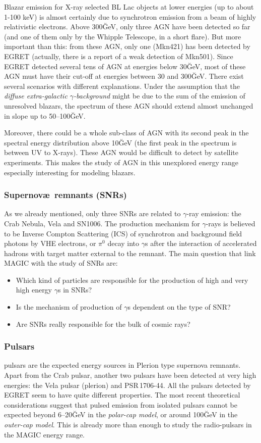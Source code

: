 Blazar emission for X-ray selected BL Lac objects at lower energies
(up to about 1-100 keV) is almost certainly due to synchrotron
emission from a beam of highly relativistic electrons. Above
300\u{GeV}, only three AGN have been detected so far (and one of them
only by the Whipple Telescope, in a short flare). But more important
than this: from these AGN, only one (Mkn421) has been detected by
EGRET (actually, there is a report of a weak detection of Mkn501).
Since EGRET detected several tens of AGN at energies below 30\u{GeV},
most of these AGN must have their cut-off at energies between 30 and
300\u{GeV}. There exist several scenarios with different explanations.
Under the assumption that the \emph{diffuse extra-galactic
  $\gamma$-background} might be due to the sum of the emission of
unresolved blazars, the spectrum of these AGN should extend almost
unchanged in slope up to 50--100\u{GeV}.

Moreover, there could be a whole sub-class of AGN with its second peak
in the spectral energy distribution above 10\u{GeV} (the first peak in
the spectrum is between UV to X-rays). These AGN would be difficult to
detect by satellite experiments. This makes the study of AGN in this
unexplored energy range especially interesting for modeling blazars.

\subsubsection*{Supernov\ae\ remnants (SNRs)}
% 
As we already mentioned, only three SNRs are related to $\gamma$-ray
emission: the Crab Nebula, Vela and SN1006. The production mechanism
for $\gamma$-rays is believed to be Inverse Compton Scattering (ICS)
of synchrotron and background field photons by VHE electrons, or
$\pi^0$ decay into $\gamma$s after the interaction of accelerated
hadrons with target matter external to the remnant. The main question
that link MAGIC with the study of SNRs are:
%
\begin{itemize}
\item Which kind of particles are responsible for the production of
high and very high energy $\gamma$s in SNRs?
\item Is the mechanism of production of $\gamma$s dependent on the
type of SNR?
\item Are SNRs really responsible for the bulk of cosmic rays?
\end{itemize}

\subsubsection*{Pulsars} 
%
pulsars are the expected energy sources in Plerion type supernova
remnants. Apart from the Crab pulsar, another two pulsars have been
detected at very high energies: the Vela pulsar (plerion) and
PSR\,1706-44. All the pulsars detected by EGRET seem to have quite
different properties. The most recent theoretical considerations
suggest that pulsed emission from isolated pulsars cannot be expected
beyond 6--20\u{GeV} in the \emph{polar-cap model}, or around
100\u{GeV} in the \emph{outer-cap model}. This is already more than
enough to study the radio-pulsars in the MAGIC energy range.

